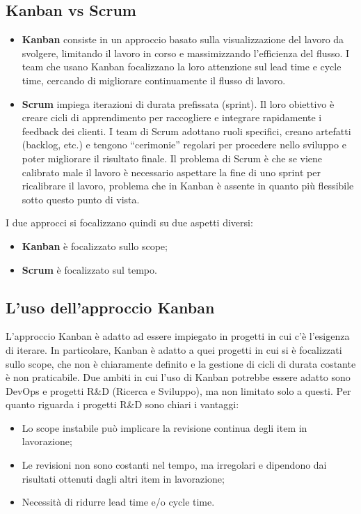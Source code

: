 \subsection{Kanban vs Scrum}
\begin{itemize}
	\item \textbf{Kanban} consiste in un approccio basato sulla visualizzazione del lavoro da svolgere, limitando il lavoro in corso e massimizzando l'efficienza del flusso. I team che usano Kanban focalizzano la loro attenzione sul lead time e cycle time, cercando di migliorare continuamente il flusso di lavoro.
	\item \textbf{Scrum} impiega iterazioni di durata prefissata (sprint). Il loro obiettivo è creare cicli di apprendimento per raccogliere e integrare rapidamente i feedback dei clienti. I team di Scrum adottano ruoli specifici, creano artefatti (backlog, etc.) e tengono “cerimonie” regolari per procedere nello sviluppo e poter migliorare il risultato finale. Il problema di Scrum è che se viene calibrato male il lavoro è necessario aspettare la fine di uno sprint per ricalibrare il lavoro, problema che in Kanban è assente in quanto più flessibile sotto questo punto di vista.
\end{itemize}
\begin{info}
	I due approcci si focalizzano quindi su due aspetti diversi:
	\begin{itemize}
		\item \textbf{Kanban} è focalizzato sullo scope;
		\item \textbf{Scrum} è focalizzato sul tempo.
	\end{itemize}
\end{info}
\subsection{L’uso dell’approccio Kanban}
L’approccio Kanban è adatto ad essere impiegato in progetti in cui c’è l’esigenza di iterare. In particolare, Kanban è adatto a quei progetti in cui si è focalizzati sullo scope, che non è chiaramente definito e la gestione di cicli di durata costante è non praticabile. Due ambiti in cui l’uso di Kanban potrebbe essere adatto sono DevOps e progetti R\&D (Ricerca e Sviluppo), ma non limitato solo a questi.
Per quanto riguarda i progetti R\&D sono chiari i vantaggi:
\begin{itemize}
	\item Lo scope instabile può implicare la revisione continua degli item in lavorazione;
	\item Le revisioni non sono costanti nel tempo, ma irregolari e dipendono dai risultati ottenuti dagli altri item in lavorazione;
	\item Necessità di ridurre lead time e/o cycle time.
\end{itemize}

